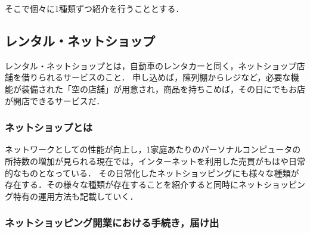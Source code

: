 そこで個々に1種類ずつ紹介を行うこととする．

\subsection{レンタル・ネットショップ}

レンタル・ネットショップとは，自動車のレンタカーと同く，ネットショップ店舗を借りられるサービスのこと．
申し込めば，陳列棚からレジなど，必要な機能が装備された「空の店舗」が用意され，商品を持ちこめば，その日にでもお店が開店できるサービスだ．

\subsubsection{ネットショップとは}

ネットワークとしての性能が向上し，1家庭あたりのパーソナルコンピュータの所持数の増加が見られる現在では，インターネットを利用した売買がもはや日常的なものとなっている．
その日常化したネットショッピングにも様々な種類が存在する．その様々な種類が存在することを紹介すると同時にネットショッピング特有の運用方法も記載していく．\cite{netshop}

\subsubsection{ネットショッピング開業における手続き，届け出}

